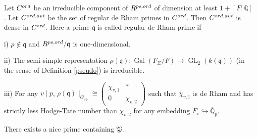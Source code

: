 \documentclass[10pt,a4paper]{amsart}
\begin{document}
\begin{lem}\label{dense}
	Let $C^{\textnormal{ord}}$ be an irreducible component of $ R^{\textnormal{ps,ord}}$ of dimension at least $1+[F: \mathbb{Q}]$.
	 Let $ C^{\textnormal{ord,aut}}$ be the set of regular de Rham primes in $C^{\textnormal{ord}}$. Then $C^{\textnormal{ord,aut}} $ is dense in $C^{\textnormal{ord}}$. Here a prime $\mathfrak{q}$ is called regular de Rham prime if
	
	\quad i) $p \notin \mathfrak{q}$ and $R^{\textnormal{ps,ord}}/\mathfrak{q} $ is one-dimensional.
	
	\quad ii) The semi-simple representation $\rho(\mathfrak{q}): \operatorname{Gal}(F_{\Sigma}/F) \to \operatorname{GL}_2(k(\mathfrak{q}))$ (in the sense of Definition \ref{pseudo}) is irreducible.
	
	\quad iii) For any $v \mid p$, $\rho(\mathfrak{q}) \mid_{G_{F_v}} \cong  \begin{pmatrix}
		\chi_{v,1} & *\\
		0 & \chi_{v,2}
	\end{pmatrix}$ such that $\chi_{v,1} $ is de Rham and has strictly less Hodge-Tate number than $\chi_{v,2} $ for any embedding $F_v \hookrightarrow \overline{\mathbb{Q}}_p$.
\end{lem}

	\begin{lem}
		There exists a nice prime containing $\mathfrak{P}$.
	\end{lem}
\end{document}
